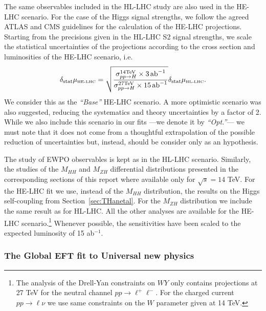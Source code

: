 The same observables included in the HL-LHC study are also used in the HE-LHC scenario. 
For the case of the Higgs signal strengths, we follow the agreed ATLAS and CMS guidelines for the calculation of
the HE-LHC projections.
Starting from the precisions given in the HL-LHC S2 signal strengths, we scale the statistical uncertainties of the projections
according to the cross section and luminosities of the HE-LHC scenario, i.e.
%
\begin{equation}
\delta_{\mathrm{stat}} \mu_{\mbox{\tiny HE-LHC}} = \sqrt{\frac{\sigma_{pp\to H}^{\mathrm{14 TeV}}\times 3~\!\mathrm{ab}^{-1}}{\sigma_{pp\to H}^{\mathrm{27 TeV}}\times 15~\! \mathrm{ab}^{-1}}} \delta_{\mathrm{stat}} \mu_{\mbox{\tiny HL-LHC}} .
\end{equation}
%
We consider this as the {\it ``Base''} HE-LHC scenario. A more optimistic scenario was also suggested, reducing the 
systematics and theory uncertainties by a factor of 2. While we also include this scenario in our fits ---we denote it by {\it ``Opt.''}---
we must note that it does not come from a thoughtful extrapolation of the possible reduction of uncertainties but, instead, 
should be consider only as an hypothesis.

The study of EWPO observables is kept as in the HL-LHC scenario. Similarly, the studies of the $M_{HH}$ and $M_{ZH}$ differential distributions presented in the corresponding sections of this report where available only for $\sqrt{s}=14$ TeV. For the HE-LHC fit we use, instead of the $M_{HH}$ distribution, the results on the Higgs self-coupling from Section~\ref{sec:THanetal}. For  the $M_{ZH}$ distribution we include the same result as for HL-LHC. All the other analyses are available for the HE-LHC scenario.\footnote{The analysis of the Drell-Yan constraints on $WY$ only contains projections at 27 TeV for the neutral channel $pp\to \ell^+ \ell^-$. For the charged current $pp\to \ell \nu$ we use same constraints on the $W$ parameter given at 14 TeV.} Whenever possible, the sensitivities have been scaled to the
expected luminosity of 15 ab$^{-1}$.


\subsubsection*{The Global EFT fit to Universal new physics}
\label{sec:results}

